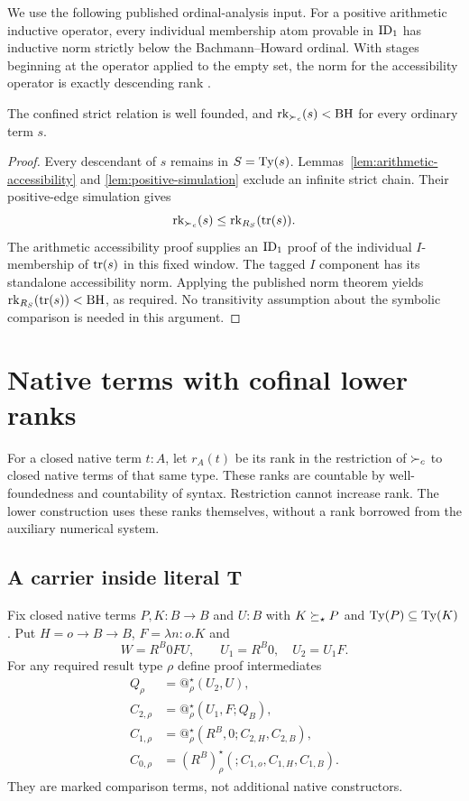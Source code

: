 We use the following published ordinal-analysis input. For a positive
arithmetic inductive operator, every individual membership atom provable
in $\mathrm{ID}_1$ has inductive norm strictly below the Bachmann--Howard ordinal.
With stages beginning at the operator applied to the empty set, the
norm for the accessibility operator is exactly descending rank
\cite[Definitions~6.3.1, 6.3.5 and 9.1.2,
Lemma~6.5.2, Theorems~9.5.5--9.5.6]{pohlers}.

\begin{theorem}\label{thm:upper}
The confined strict relation is well founded, and
$\operatorname{rk}_{\succ_c}(s)<\mathrm{BH}$ for every ordinary term $s$.
\end{theorem}
\begin{proof}
Every descendant of $s$ remains in $S=\operatorname{Ty}(s)$.
Lemmas~\ref{lem:arithmetic-accessibility} and
\ref{lem:positive-simulation} exclude an infinite strict chain.
Their positive-edge simulation gives
\[
 \operatorname{rk}_{\succ_c}(s)\le \operatorname{rk}_{R_S}(\operatorname{tr}(s)).
\]
The arithmetic accessibility proof supplies an $\mathrm{ID}_1$ proof of the
individual $I$-membership of $\operatorname{tr}(s)$ in this fixed window. The tagged
$I$ component has its standalone accessibility norm. Applying the
published norm theorem yields
$\operatorname{rk}_{R_S}(\operatorname{tr}(s))<\mathrm{BH}$, as required. No transitivity assumption
about the symbolic comparison is needed in this argument.
\end{proof}

\section{Native terms with cofinal lower ranks}\label{sec:lower}

For a closed native term $t:A$, let $r_A(t)$ be its rank in the
restriction of $\succ_c$ to closed native terms of that same type.
These ranks are countable by well-foundedness and countability of
syntax. Restriction cannot increase rank. The lower construction
uses these ranks themselves, without a rank borrowed from the
auxiliary numerical system.

\subsection{A carrier inside literal T}
Fix closed native terms $P,K:B\to B$ and $U:B$ with $K\succeq_\star P$
and $\operatorname{Ty}(P)\subseteq\operatorname{Ty}(K)$. Put
$H=o\to B\to B$, $F=\lambda n:o.K$ and
\[
 W=R^B0FU,\qquad U_1=R^B0,\quad U_2=U_1F.
\]
For any required result type $\rho$ define proof intermediates
\[
\begin{aligned}
 Q_\rho&=@^\star_\rho(U_2,U),\\
 C_{2,\rho}&=@^\star_\rho(U_1,F;Q_B),\\
 C_{1,\rho}&=@^\star_\rho(R^B,0;C_{2,H},C_{2,B}),\\
 C_{0,\rho}&=(R^B)^\star_\rho(;C_{1,o},C_{1,H},C_{1,B}).
\end{aligned}
\]
They are marked comparison terms, not additional native constructors.


